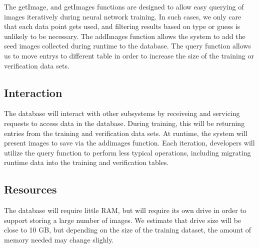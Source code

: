 The getImage, and getImages functions are designed to allow easy querying of images iteratively during neural network training. In such cases, we only care that each data point gets used, and filtering results based on type or guess is unlikely to be necessary.
The addImages function allows the system to add the seed images collected during runtime to the database.
The query function allows us to move entrys to different table in order to increase the size of the training or verification data sets. 

\subsection{Interaction}

The database will interact with other subsystems by receiveing and servicing requests to access data in the database. During training, this will be returning entries from the training and verification data sets. At runtime, the system will present images to save via the addimages function. Each iteration, developers will utilize the query function to perform less typical operations, including migrating runtime data into the training and verification tables.

\subsection{Resources}

The database will require little RAM, but will require its own drive in order to support storing a large number of images. We estimate that drive size will be close to 10 GB, but depending on the size of the training dataset, the amount of memory needed may change slighly.


